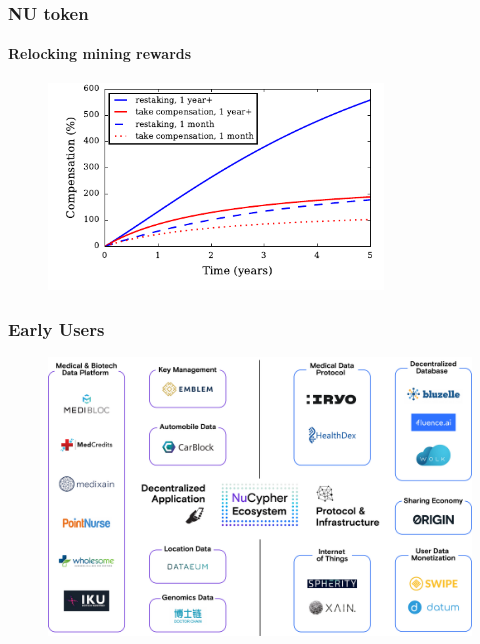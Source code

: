 \documentclass[xetex,mathsans,sans,aspectratio=169]{beamer}
\begin{document}
    \begin{frame}
        \frametitle{NU token}
        \framesubtitle{Relocking mining rewards}
        \begin{figure}
            \centering
            \includegraphics[height=5.5cm]{pdf/total-compensation.pdf}
        \end{figure}
    \end{frame}

    \begin{frame}
      \frametitle{Early Users}
      \begin{figure}
           \includegraphics[width=11.5cm]{pdf/projects.pdf}
      \end{figure}
    \end{frame}
\end{document}
